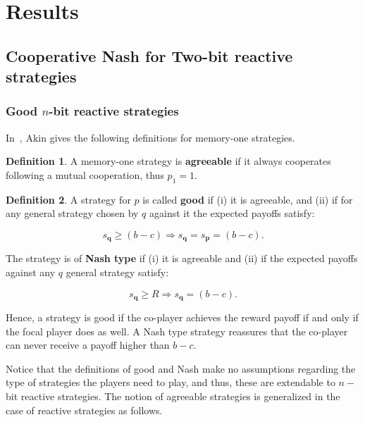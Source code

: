 \documentclass{article}
\theoremstyle{definition}
\newtheorem{definition}{Definition}[section]
\begin{document}
\section{Results}

\subsection{Cooperative Nash for Two-bit reactive strategies}\label{section:good_nash_strategies}

\subsubsection{Good \(n\)-bit reactive strategies}

In~\citep{akin:EGADS:2016}, Akin gives the following definitions for memory-one
strategies.

\begin{definition}
A memory-one strategy is \textbf{agreeable} if it always cooperates following a mutual cooperation,
thus \(p_1=1\).
\end{definition}

\begin{definition}
  A strategy for \(p\) is called \textbf{good} if (i) it is agreeable,
  and (ii) if for any general strategy chosen by \(q\) against it the expected
  payoffs satisfy:
  
  \begin{equation}
    s_{\mathbf{q}} \geq (b - c) \Rightarrow s_{\mathbf{q}} = s_{\mathbf{p}} =  (b - c).
  \end{equation}

  The strategy is of \textbf{Nash type} if (i) it is agreeable and (ii) if the
  expected payoffs against any \(q\) general strategy satisfy:

  \begin{equation}
    s_{\mathbf{q}} \geq R \Rightarrow s_{\mathbf{q}} =  (b - c).
  \end{equation}
\end{definition}

Hence, a strategy is good if the co-player achieves the reward payoff if and
only if the focal player does as well. A Nash type strategy reassures that the
co-player can never receive a payoff higher than \(b - c\).

Notice that the definitions of good and Nash make no assumptions regarding the type of
strategies the players need to play, and thus, these are extendable to \(n-\)
bit reactive strategies. The notion of agreeable strategies is generalized
in the case of reactive strategies as follows.
\end{document}
